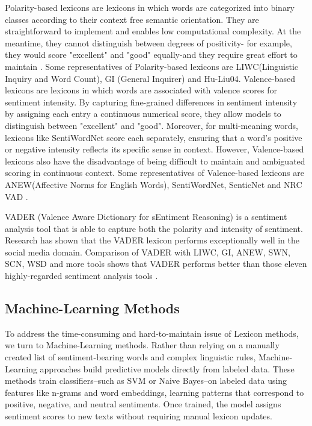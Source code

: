 \documentclass{xum_review}
\begin{document}
Polarity-based lexicons are lexicons in which words are categorized into binary
classes according to their context free semantic orientation. They are
straightforward to implement and enables low computational complexity. At the
meantime, they cannot distinguish between degrees of positivity- for example,
they would score "excellent" and "good" equally-and they require great effort to
maintain \citep{tripathi2016survey}. Some representatives of Polarity-based
lexicons are LIWC(Linguistic Inquiry and Word Count), GI (General Inquirer) and
Hu-Liu04. Valence-based lexicons are lexicons in which words are associated with
valence scores for sentiment intensity. By capturing fine-grained differences in
sentiment intensity by assigning each entry a continuous numerical score, they
allow models to distinguish between "excellent" and "good". Moreover, for
multi-meaning words, lexicons like SentiWordNet score each separately, ensuring
that a word's positive or negative intensity reflects its specific sense in
context. However, Valence-based lexicons also have the disadvantage of being
difficult to maintain \citep{yadollahi2018current} and ambiguated scoring in
continuous context. Some representatives of Valence-based lexicons are
ANEW(Affective Norms for English Words), SentiWordNet, SenticNet and NRC
VAD \citep{mohammad2018obtaining}. 

VADER (Valence Aware Dictionary for sEntiment Reasoning) is a sentiment analysis
tool that is able to capture both the polarity and intensity of sentiment.
Research has shown that the VADER lexicon performs exceptionally well in the
social media domain. Comparison of VADER with LIWC, GI, ANEW, SWN, SCN, WSD and
more tools shows that VADER performs better than those eleven highly-regarded
sentiment analysis tools \citep{hutto2014vader}.

\subsection{Machine-Learning Methods}

To address the time-consuming and hard-to-maintain issue of Lexicon methods, we
turn to Machine-Learning methods. Rather than relying on a manually created list
of sentiment-bearing words and complex linguistic rules, Machine-Learning
approaches build predictive models directly from labeled data. These methods
train classifiers--such as SVM or Naive Bayes--on labeled data using features like
n-grams and word embeddings, learning patterns that correspond to positive,
negative, and neutral sentiments. Once trained, the model assigns sentiment
scores to new texts without requiring manual lexicon updates. 
\end{document}
